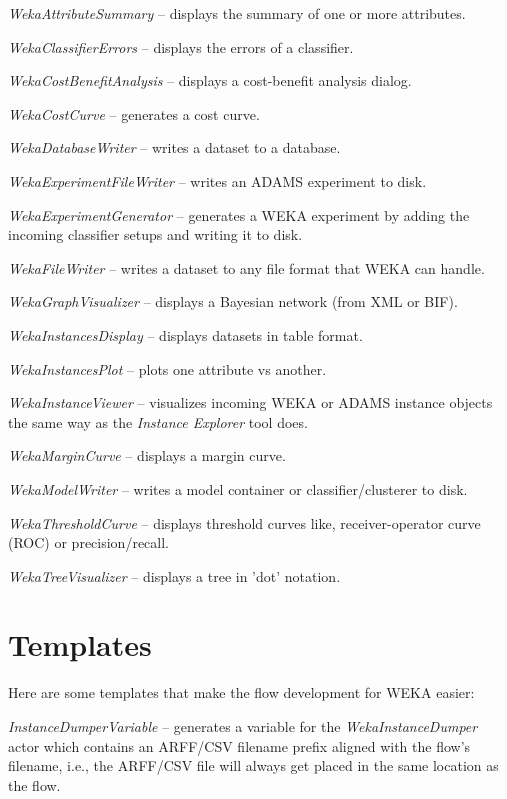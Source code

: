 \begin{tight_itemize}
	\item \textit{WekaAttributeSummary} -- displays the summary of one or more attributes.
	\item \textit{WekaClassifierErrors} -- displays the errors of a classifier.
	\item \textit{WekaCostBenefitAnalysis} -- displays a cost-benefit analysis dialog.
	\item \textit{WekaCostCurve} -- generates a cost curve.
	\item \textit{WekaDatabaseWriter} -- writes a dataset to a database.
	\item \textit{WekaExperimentFileWriter} -- writes an ADAMS experiment to disk.
	\item \textit{WekaExperimentGenerator} -- generates a WEKA experiment by
	adding the incoming classifier setups and writing it to disk.
	\item \textit{WekaFileWriter} -- writes a dataset to any file format that
	WEKA can handle.
	\item \textit{WekaGraphVisualizer} -- displays a Bayesian network (from XML or BIF).
	\item \textit{WekaInstancesDisplay} -- displays datasets in table format.
	\item \textit{WekaInstancesPlot} -- plots one attribute vs another.
	\item \textit{WekaInstanceViewer} -- visualizes incoming WEKA or ADAMS
	instance objects the same way as the \textit{Instance Explorer} tool does.
	\item \textit{WekaMarginCurve} -- displays a margin curve.
	\item \textit{WekaModelWriter} -- writes a model container or
	classifier/clusterer to disk.
	\item \textit{WekaThresholdCurve} -- displays threshold curves like, 
	receiver-operator curve (ROC) or precision/recall.
	\item \textit{WekaTreeVisualizer} -- displays a tree in 'dot' notation.
\end{tight_itemize}

\section{Templates}
Here are some templates that make the flow development for WEKA easier:
\begin{tight_itemize}
	\item \textit{InstanceDumperVariable} -- generates a variable for the 
	\textit{WekaInstanceDumper} actor which contains an ARFF/CSV filename 
	prefix aligned with the flow's filename, i.e., the ARFF/CSV file will 
	always get placed in the same location as the flow.
\end{tight_itemize}
